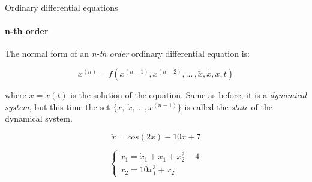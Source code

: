 \documentclass{beamer}
\begin{document}
\begin{frame}{Ordinary differential equations}
\framesubtitle{n-th order}
\begin{flushleft}

The normal form of an \emph{n-th order} ordinary differential equation is:

\begin{equation}
	x^{(n)} = f (x^{(n-1)}, x^{(n-2)}, ...\,, \ddot{x}, \dot{x}, x, t)
\end{equation}
			
where $x = x(t)$ is the solution of the equation. Same as before, it is a \emph{dynamical system}, but this time the set $\{ x, \ \dot{x} , ...\,,x^{(n-1)} \}$ is called the \emph{state} of the dynamical system.

\begin{example}
\begin{equation}
    \ddot{x} = cos(2\dot{x}) - 10 x + 7 
\end{equation}
\end{example}


\begin{example}
\begin{equation}
\begin{cases}
    \dddot{x}_1 = \dot{x}_1 + x_1 + x_2^2 - 4 \\
    \dddot{x}_2 = 10 x_1^3 + \ddot{x}_2
\end{cases}
\end{equation}
\end{example}

\end{flushleft}
\end{frame}
\end{document}
